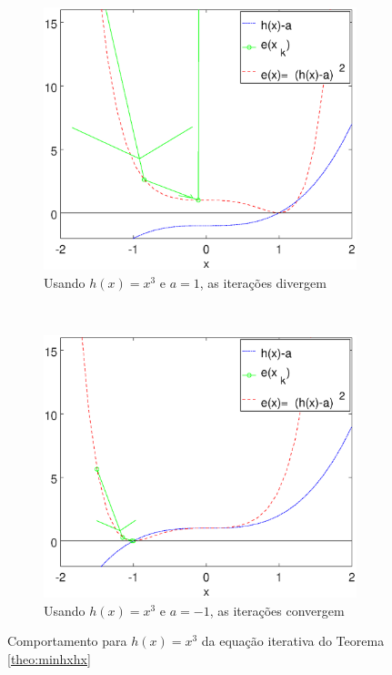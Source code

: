 \begin{figure}[!h]
    \centering
    \begin{subfigure}[b]{0.45\textwidth}
        \includegraphics[width=\textwidth]{chapters/minimization/mfiles/hx3_a/minimizando_hx_a_1.eps}
        \caption{Usando $h(x)=x^3$ e $a=1$, as iterações divergem}
        \label{fig:hxacases3a}
    \end{subfigure}
    ~ %
    \begin{subfigure}[b]{0.45\textwidth}
        \includegraphics[width=\textwidth]{chapters/minimization/mfiles/hx3_a/minimizando_hx_a_2.eps}
        \caption{Usando $h(x)=x^3$ e $a=-1$, as iterações convergem}
        \label{fig:hxacases3b}
    \end{subfigure}
    \caption{Comportamento para $h(x)=x^3$ da equação iterativa do Teorema \ref{theo:minhxhx}}
    \label{fig:hxacases3}
\end{figure}

